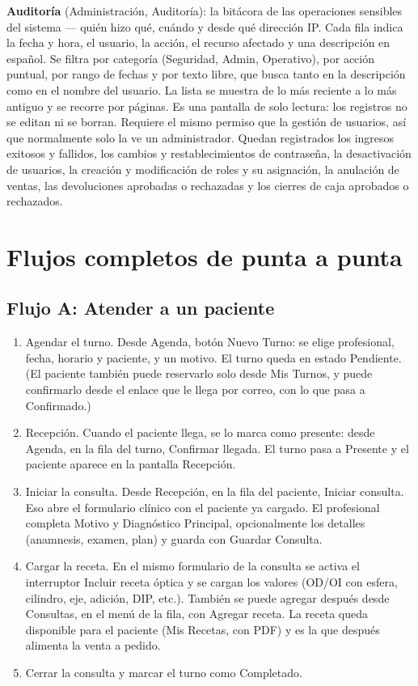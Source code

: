 \textbf{Auditoría} (Administración, Auditoría): la bitácora de las operaciones sensibles del sistema --- quién hizo qué, cuándo y desde qué dirección IP. Cada fila indica la fecha y hora, el usuario, la acción, el recurso afectado y una descripción en español. Se filtra por categoría (Seguridad, Admin, Operativo), por acción puntual, por rango de fechas y por texto libre, que busca tanto en la descripción como en el nombre del usuario. La lista se muestra de lo más reciente a lo más antiguo y se recorre por páginas. Es una pantalla de solo lectura: los registros no se editan ni se borran. Requiere el mismo permiso que la gestión de usuarios, así que normalmente solo la ve un administrador. Quedan registrados los ingresos exitosos y fallidos, los cambios y restablecimientos de contraseña, la desactivación de usuarios, la creación y modificación de roles y su asignación, la anulación de ventas, las devoluciones aprobadas o rechazadas y los cierres de caja aprobados o rechazados.

\section{Flujos completos de punta a punta}
\label{sec:mu-flujos}

\subsection{Flujo A: Atender a un paciente}
\label{sec:mu-flujo-a}

\begin{enumerate}
  \item Agendar el turno. Desde Agenda, botón Nuevo Turno: se elige profesional, fecha, horario y paciente, y un motivo. El turno queda en estado Pendiente. (El paciente también puede reservarlo solo desde Mis Turnos, y puede confirmarlo desde el enlace que le llega por correo, con lo que pasa a Confirmado.)
  \item Recepción. Cuando el paciente llega, se lo marca como presente: desde Agenda, en la fila del turno, Confirmar llegada. El turno pasa a Presente y el paciente aparece en la pantalla Recepción.
  \item Iniciar la consulta. Desde Recepción, en la fila del paciente, Iniciar consulta. Eso abre el formulario clínico con el paciente ya cargado. El profesional completa Motivo y Diagnóstico Principal, opcionalmente los detalles (anamnesis, examen, plan) y guarda con Guardar Consulta.
  \item Cargar la receta. En el mismo formulario de la consulta se activa el interruptor Incluir receta óptica y se cargan los valores (OD/OI con esfera, cilindro, eje, adición, DIP, etc.). También se puede agregar después desde Consultas, en el menú de la fila, con Agregar receta. La receta queda disponible para el paciente (Mis Recetas, con PDF) y es la que después alimenta la venta a pedido.
  \item Cerrar la consulta y marcar el turno como Completado.
\end{enumerate}

